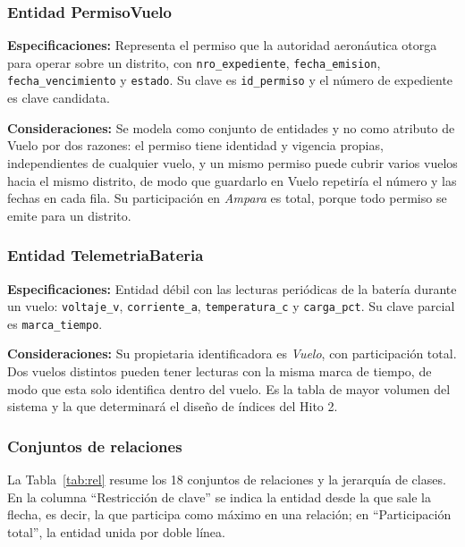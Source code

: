 \documentclass[11pt,a4paper]{article}
\newcommand{\at}[1]{\texttt{#1}}
\begin{document}
\subsubsection{Entidad PermisoVuelo}
\textbf{Especificaciones:} Representa el permiso que la autoridad aeronáutica otorga para operar sobre un distrito, con \at{nro\_expediente}, \at{fecha\_emision}, \at{fecha\_vencimiento} y \at{estado}. Su clave es \at{id\_permiso} y el número de expediente es clave candidata.

\textbf{Consideraciones:} Se modela como conjunto de entidades y no como atributo de Vuelo por dos razones: el permiso tiene identidad y vigencia propias, independientes de cualquier vuelo, y un mismo permiso puede cubrir varios vuelos hacia el mismo distrito, de modo que guardarlo en Vuelo repetiría el número y las fechas en cada fila. Su participación en \textit{Ampara} es total, porque todo permiso se emite para un distrito.

\subsubsection{Entidad TelemetriaBateria}
\textbf{Especificaciones:} Entidad débil con las lecturas periódicas de la batería durante un vuelo: \at{voltaje\_v}, \at{corriente\_a}, \at{temperatura\_c} y \at{carga\_pct}. Su clave parcial es \at{marca\_tiempo}.

\textbf{Consideraciones:} Su propietaria identificadora es \textit{Vuelo}, con participación total. Dos vuelos distintos pueden tener lecturas con la misma marca de tiempo, de modo que esta solo identifica dentro del vuelo. Es la tabla de mayor volumen del sistema y la que determinará el diseño de índices del Hito 2.

\subsubsection{Conjuntos de relaciones}
La Tabla~\ref{tab:rel} resume los 18 conjuntos de relaciones y la jerarquía de clases. En la columna ``Restricción de clave'' se indica la entidad desde la que sale la flecha, es decir, la que participa como máximo en una relación; en ``Participación total'', la entidad unida por doble línea.
\end{document}
